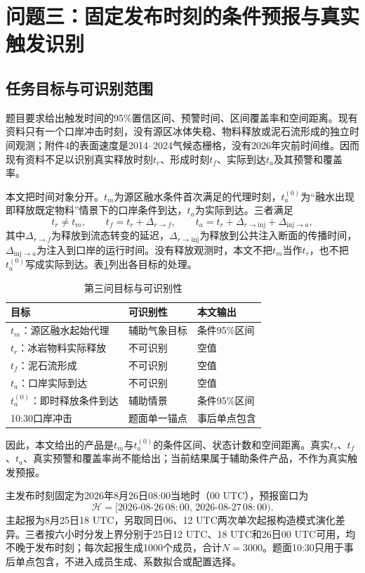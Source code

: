 \section{问题三：固定发布时刻的条件预报与真实触发识别}
\subsection{任务目标与可识别范围}
题目要求给出触发时间的95\%置信区间、预警时间、区间覆盖率和空间距离。现有资料只有一个口岸冲击时刻，没有源区冰体失稳、物料释放或泥石流形成的独立时间观测；附件4的表面速度是2014--2024气候态栅格，没有2026年灾前时间维。因而现有资料不足以识别真实释放时刻$t_r$、形成时刻$t_f$、实际到达$t_a$及其预警和覆盖率。

本文把时间对象分开。$t_m$为源区融水条件首次满足的代理时刻，$t_a^{(0)}$为“融水出现即释放既定物料”情景下的口岸条件到达，$t_a$为实际到达。三者满足
\begin{equation}
t_r\ne t_m,\qquad
t_f=t_r+\Delta_{r\to f},\qquad
t_a=t_r+\Delta_{r\to\mathrm{inj}}+\Delta_{\mathrm{inj}\to a},
\label{eq:times}
\end{equation}
其中$\Delta_{r\to f}$为释放到流态转变的延迟，$\Delta_{r\to\mathrm{inj}}$为释放到公共注入断面的传播时间，$\Delta_{\mathrm{inj}\to a}$为注入到口岸的运行时间。没有释放观测时，本文不把$t_m$当作$t_r$，也不把$t_a^{(0)}$写成实际到达。表\ref{tab:q3-targets}列出各目标的处理。

\begin{table}[htbp]\centering\footnotesize
\caption{第三问目标与可识别性}\label{tab:q3-targets}
\begin{tabular}{@{}l l l@{}}\toprule
目标&可识别性&本文输出\\\midrule
$t_m$：源区融水起始代理&辅助气象目标&条件95\%区间\\
$t_r$：冰岩物料实际释放&不可识别&空值\\
$t_f$：泥石流形成&不可识别&空值\\
$t_a$：口岸实际到达&不可识别&空值\\
$t_a^{(0)}$：即时释放条件到达&辅助情景&条件95\%区间\\
10:30口岸冲击&题面单一锚点&事后单点包含\\
\bottomrule
\end{tabular}\end{table}

因此，本文给出的产品是$t_m$与$t_a^{(0)}$的条件区间、状态计数和空间距离。真实$t_r$、$t_f$、$t_a$、真实预警和覆盖率尚不能给出；当前结果属于辅助条件产品，不作为真实触发预报。

主发布时刻固定为2026年8月26日08:00当地时（00 UTC），预报窗口为
\begin{equation}
\mathcal H=[2026\text{-}08\text{-}26\,08{:}00,\,
2026\text{-}08\text{-}27\,08{:}00).
\end{equation}
主起报为8月25日18 UTC，另取同日06、12 UTC两次单次起报构造模式演化差异。三者按六小时分发上界分别于25日12 UTC、18 UTC和26日00 UTC可用，均不晚于发布时刻；每次起报生成1000个成员，合计$N=3000$。题面10:30只用于事后单点包含，不进入成员生成、系数拟合或配置选择。

